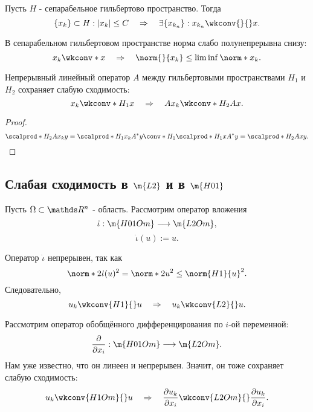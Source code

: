 \begin{note} Пусть $H$ - сепарабельное гильбертово пространство. Тогда
$$ \{ x_k \} \subset H : |x_k| \leq C \quad \Rightarrow \quad \exists \{ x_{k_n} \} : x_{k_n} \wkconv{}{} x.$$
\end{note}

\begin{note} В сепарабельном гильбертовом пространстве норма слабо полунепрерывна снизу:
$$x_k \wkconv*{}{} x \quad \Rightarrow \quad \norm{}{x_k} \leq \lim \inf \norm*{}{x_k}.$$
\end{note}


\begin{note} Непрерывный линейный оператор $A$ между гильбертовыми пространствами $H_1$ и $H_2$  сохраняет слабую сходимость:
$$ x_k \wkconv*{H_1}{} x \quad \Rightarrow \quad Ax_k \wkconv*{H_2}{} Ax.$$
\end{note}
\begin{proof}
$$ \scalprod*{H_2}{A x_k} {y} = \scalprod*{H_1}{x_k}{A^*y} \conv*{H_1}{} \scalprod*{H_1}{x}{A^*y} = \scalprod*{H_2}{Ax}{y}.$$

\end{proof}

\subsection{Слабая сходимость в $\m{L2}$ и в $\m{H01}$}
Пусть $\Omega \subset \real^n$ - область. Рассмотрим оператор вложения
$$\dot{\iota} : \m{H01Om} \longrightarrow \m{L2Om},$$
$$\dot{\iota}(u) := u.$$

Оператор $\dot{\iota}$ непрерывен, так как
$$ \norm*{2}{\dot{\iota}}(u)^2 = \norm*{2}{u}^2 \leq \norm{H1}{u}^2.$$
Следовательно,
$$ u_k \wkconv{H1}{} u \quad \Rightarrow \quad u_k \wkconv{L2}{} u.$$

Рассмотрим оператор обобщённого дифференцирования по $i$-ой переменной:
$$ \pder{x_i} : \m{H01Om} \longrightarrow \m{L2Om}.$$
Нам уже известно, что он линеен и непрерывен. Значит, он тоже сохраняет слабую сходимость:
$$ u_k \wkconv{H1Om}{} u \quad \Rightarrow \quad \pder[u_k]{x_i} \wkconv{L2Om}{} \pder[u_k]{x_i}.$$

